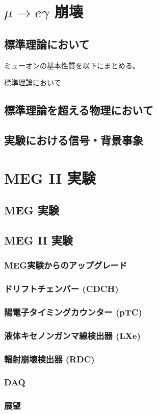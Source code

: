\documentclass[Yonemoto_master.tex]{subfiles}
\begin{document}
\chapter{$\mu \to e \gamma$ 崩壊}

\section{標準理論において}
ミューオンの基本性質を以下にまとめる。\cite{muon}

標準理論において\cite{muon_sm}
\section{標準理論を超える物理において}
\section{実験における信号・背景事象}

\chapter{MEG II 実験}

\section{MEG 実験}
\section{MEG II 実験}
\subsection{MEG実験からのアップグレード}
\subsection{ドリフトチェンバー (CDCH)}
\subsection{陽電子タイミングカウンター (pTC)}
\subsection{液体キセノンガンマ線検出器 (LXe)}
\subsection{輻射崩壊検出器 (RDC)}
\subsection{DAQ}
\subsection{展望}
\end{document}
